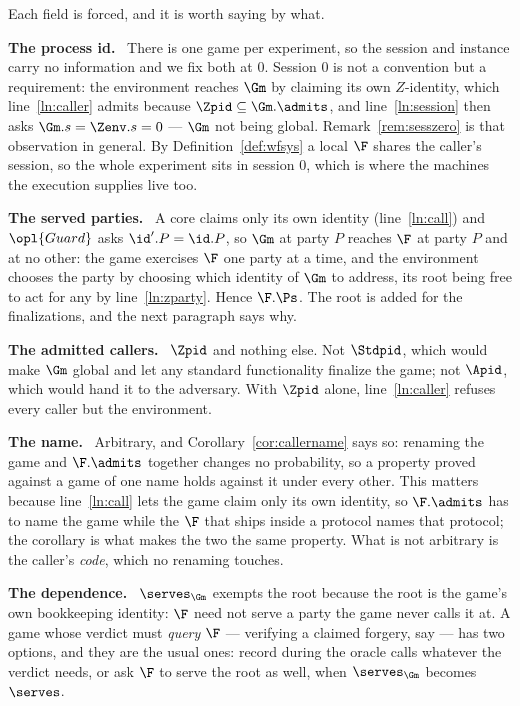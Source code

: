 \documentclass[10pt,oneside,openany]{book}
\newcommand{\heading}[1]{\medskip\par\noindent\textcolor{accent}{\textbf{#1.}}\ }
\theoremstyle{accentdef}
\theoremstyle{accentplain}
\begin{document}
Each field is forced, and it is worth saying by what.

\heading{The process id} There is one game per experiment, so the session and instance carry no
information and we fix both at $0$. Session $0$ is not a convention but a requirement: the
environment reaches $\Gm$ by claiming its own $Z$-identity, which line~\ref{ln:caller} admits because
$\Zpid \subseteq \Gm.\admits$, and line~\ref{ln:session} then asks $\Gm.s = \Zenv.s = 0$ ---
$\Gm$ not being global. Remark~\ref{rem:sesszero} is that observation in general. By
Definition~\ref{def:wfsys} a local $\F$ shares the caller's session, so the whole experiment sits in
session $0$, which is where the machines the execution supplies live too.

\heading{The served parties} A core claims only its own identity (line~\ref{ln:call}) and
$\opl{Guard}$ asks $\id'.P = \id.P$, so $\Gm$ at party $P$ reaches $\F$ at party $P$ and at no other:
the game exercises $\F$ one party at a time, and the environment chooses the party by choosing which
identity of $\Gm$ to address, its root being free to act for any by line~\ref{ln:zparty}. Hence
$\F.\Ps$. The root is added for the finalizations, and the next paragraph says why.

\heading{The admitted callers} $\Zpid$ and nothing else. Not $\Stdpid$, which would make $\Gm$ global
and let any standard functionality finalize the game; not $\Apid$, which would hand it to the
adversary. With $\Zpid$ alone, line~\ref{ln:caller} refuses every caller but the environment.

\heading{The name} Arbitrary, and Corollary~\ref{cor:callername} says so: renaming the game and
$\F.\admits$ together changes no probability, so a property proved against a game of one name holds
against it under every other. This matters because line~\ref{ln:call} lets the game claim only its own
identity, so $\F.\admits$ has to name the game while the $\F$ that ships inside a protocol names that
protocol; the corollary is what makes the two the same property. What is not arbitrary is the caller's
\emph{code}, which no renaming touches.

\heading{The dependence} $\serves_{\Gm}$ exempts the root because the root is the game's own
bookkeeping identity: $\F$ need not serve a party the game never calls it at. A game whose verdict
must \emph{query} $\F$ --- verifying a claimed forgery, say --- has two options, and they are the
usual ones: record during the oracle calls whatever the verdict needs, or ask $\F$ to serve the root
as well, when $\serves_{\Gm}$ becomes $\serves$.
\end{document}
